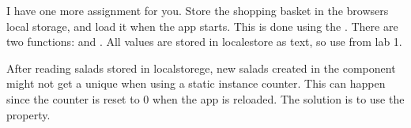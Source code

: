 \documentclass[fleqn, article, a4paper]{memoir}
\begin{document}
\begin{Assignments}
\item I have one more assignment for you. Store the shopping basket in the browsers local storage, and load it when the app starts. This is done using the . There are two functions:  and . All values are stored in localestore as text, so use  from lab 1.

After reading salads stored in localstorege, new salads created in the  component might not get a unique  when using a static instance counter. This can happen since the counter is reset to 0 when the app is reloaded. The solution is to use the  property.
\end{Assignments}

\end{document}
